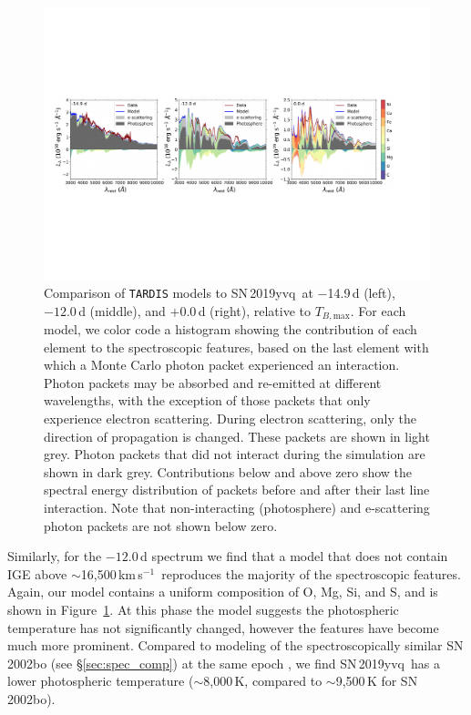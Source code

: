 \documentclass[twocolumn]{aastex63}
\newcommand{\tbmax}{$T_{B,\mathrm{max}}$}
\newcommand{\kms}{km\,s$^{-1}$}
\newcommand{\sn}{SN\,2019yvq}
\begin{document}
\begin{figure}
    \centering
    \includegraphics[width=\textwidth]{./figures/tardis.pdf}
    \caption{Comparison of \texttt{TARDIS} models to \sn\ at $-$14.9\,d
    (left), $-12.0$\,d (middle), and $+$0.0\,d (right), relative to \tbmax.
    For each model, we color code a histogram showing the contribution of each
    element to the spectroscopic features, based on the last element with
    which a Monte Carlo photon packet experienced an interaction. Photon
    packets may be absorbed and re-emitted at different wavelengths, with the
    exception of those packets that only experience electron scattering.
    During electron scattering, only the direction of propagation is changed.
    These packets are shown in light grey. Photon packets that did not
    interact during the simulation are shown in dark grey. Contributions below
    and above zero show the spectral energy distribution of packets before and
    after their last line interaction. Note that non-interacting (photosphere)
    and e-scattering photon packets are not shown below zero.}
    \label{fig:tardis}
\end{figure}

Similarly, for the $-12.0$\,d spectrum we find that a model that does not
contain IGE above $\sim$16,500\,\kms\ reproduces the majority of the
spectroscopic features. Again, our model contains a uniform composition of O,
Mg, Si, and S, and is shown in Figure~\ref{fig:tardis}. At this phase the model
suggests the photospheric temperature has not significantly changed, however
the features have become much more prominent. Compared to modeling of the
spectroscopically similar SN\,2002bo (see \S\ref{sec:spec_comp}) at the same
epoch \citep{Stehle05}, we find \sn\ has a lower photospheric temperature
($\sim$8,000\,K, compared to $\sim$9,500\,K for SN\,2002bo).
\end{document}

